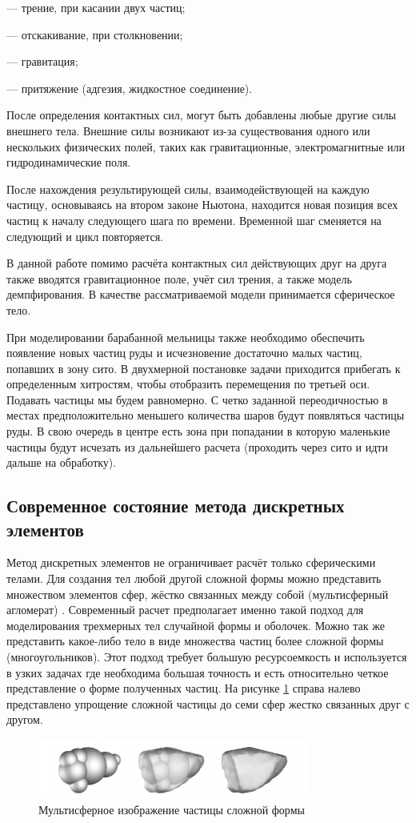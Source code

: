 \documentclass[utf8x, 14pt, oneside, a4paper]{article}
\begin{document}
--- трение, при касании двух частиц;

--- отскакивание, при столкновении;

--- гравитация;

--- притяжение (адгезия, жидкостное соединение).

После определения контактных сил, могут быть добавлены любые другие силы внешнего тела. 
Внешние силы возникают из-за существования одного или нескольких физических полей, таких как гравитационные, электромагнитные или гидродинамические поля.

После нахождения результирующей силы, взаимодействующей на каждую частицу, основываясь на втором законе Ньютона, находится новая позиция всех частиц к началу следующего шага по времени.
Временной шаг сменяется на следующий и цикл повторяется.

В данной работе помимо расчёта контактных сил действующих друг на друга также вводятся гравитационное поле, учёт сил трения, а также модель демпфирования. 
В качестве рассматриваемой модели принимается сферическое тело.

При моделировании барабанной мельницы также необходимо обеспечить появление новых частиц руды и исчезновение достаточно малых частиц, попавших в зону сито.
В двухмерной постановке задачи приходится прибегать к определенным хитростям, чтобы отобразить перемещения по третьей оси.
Подавать частицы мы будем равномерно. 
С четко заданной переодичностью в местах предположительно меньшего количества шаров будут появляться частицы руды.
В свою очередь в центре есть зона при попадании в которую маленькие частицы будут исчезать из дальнейшего расчета (проходить через сито и идти дальше на обработку).


\subsection*{Современное состояние метода дискретных элементов}

Метод дискретных элементов не ограничивает расчёт только сферическими телами. 
Для создания тел любой другой сложной формы можно представить множеством элементов сфер, жёстко связанных между собой (мультисферный агломерат) \cite{aglomerath}.
Современный расчет предполагает именно такой подход для моделирования трехмерных тел случайной формы и оболочек.
Можно так же представить какое-либо тело в виде множества частиц более сложной формы (многоугольников). 
Этот подход требует большую ресурсоемкость и используется в узких задачах где необходима большая точность и есть относительно четкое представление о форме полученных частиц.
На рисунке \ref{pic:aglomerath} справа налево представлено упрощение сложной частицы до семи сфер жестко связанных друг с другом.
\begin{figure}[H]
	\centering
	\includegraphics[width=0.8\textwidth]{aglomerath}
	\caption{Мультисферное изображение частицы сложной формы \cite{another_hard}}
	\label{pic:aglomerath}
\end{figure} 
\end{document}
